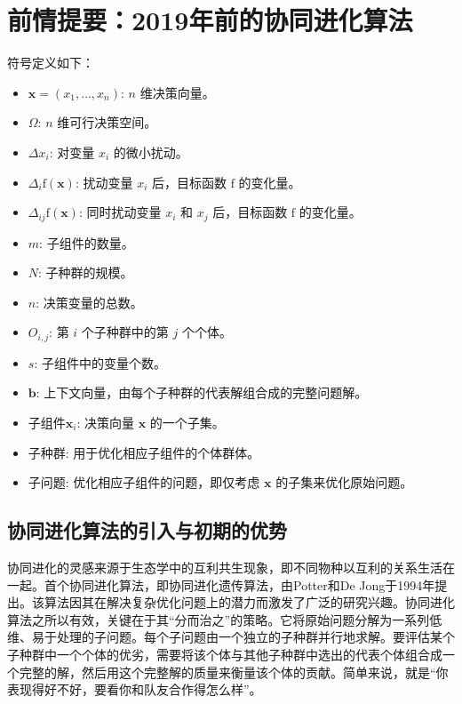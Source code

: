 \section{前情提要：2019年前的协同进化算法}

符号定义如下：
\begin{itemize}
\item $\mathbf{x} = (x_1, \dots, x_n)$: $n$ 维决策向量。
\item $\Omega$: $n$ 维可行决策空间。
\item $\Delta x_i$: 对变量 $x_i$ 的微小扰动。
\item $\Delta_i \mathrm{f}(\mathbf{x})$: 扰动变量 $x_i$ 后，目标函数 $\mathrm{f}$ 的变化量。
\item $\Delta_{ij} \mathrm{f}(\mathbf{x})$: 同时扰动变量 $x_i$ 和 $x_j$ 后，目标函数 $\mathrm{f}$ 的变化量。
\item $m$: 子组件的数量。
\item $N$: 子种群的规模。
\item $n$: 决策变量的总数。
\item $O_{i,j}$: 第 $i$ 个子种群中的第 $j$ 个个体。
\item $s$: 子组件中的变量个数。
\item $\mathbf{b}$: 上下文向量，由每个子种群的代表解组合成的完整问题解。
\item 子组件$\mathbf{x}_i$: 决策向量 $\mathbf{x}$ 的一个子集。
\item 子种群: 用于优化相应子组件的个体群体。
\item 子问题: 优化相应子组件的问题，即仅考虑 $\mathbf{x}$ 的子集来优化原始问题。
\end{itemize}

\subsection{协同进化算法的引入与初期的优势}

协同进化的灵感来源于生态学中的互利共生现象，即不同物种以互利的关系生活在一起。首个协同进化算法，即协同进化遗传算法，由Potter和De Jong于1994年提出。该算法因其在解决复杂优化问题上的潜力而激发了广泛的研究兴趣。协同进化算法之所以有效，关键在于其“分而治之”的策略。它将原始问题分解为一系列低维、易于处理的子问题。每个子问题由一个独立的子种群并行地求解。要评估某个子种群中一个个体的优劣，需要将该个体与其他子种群中选出的代表个体组合成一个完整的解，然后用这个完整解的质量来衡量该个体的贡献。简单来说，就是“你表现得好不好，要看你和队友合作得怎么样”。

